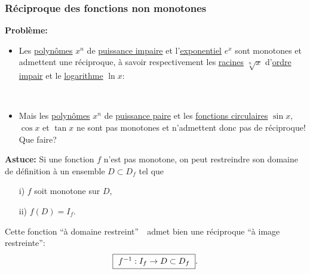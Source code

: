\documentclass[10pt]{beamer}
\newcommand{\bitem}{\item[$\bullet$]}
\begin{document}

\begin{frame}[plain]
\frametitle{\bf R\'eciproque des fonctions non monotones}
\medskip 

{\bf Probl\`eme:}
\begin{itemize}
\bitem
Les \underline{polyn\^omes} $x^n$ de \underline{puissance impaire} et 
l'\underline{exponentiel} $e^x$ sont monotones et admettent 
une r\'eciproque, \`a savoir respectivement les \underline{racines} $\sqrt[n]{x}$ 
d'\underline{ordre impair} et le \underline{logarithme} $\ln{x}$: 
\begin{center}
\\ 
\end{center}
 \vspace*{1mm}

\pause
\bitem
Mais les \underline{polyn\^omes} $x^n$ de \underline{puissance paire} et  
les \underline{fonctions circulaires} $\sin x$, $\cos x$ et $\tan x$ 
ne sont pas monotones et n'admettent donc pas de r\'eciproque! 
Que faire?
\end{itemize}
\vspace*{1mm}

\pause
{\bf Astuce:}\quad 
Si une fonction $f$ n'est pas monotone, on peut restreindre 
son domaine de d\'efinition \`a un ensemble $D\subset D_f$ tel que 
\vspace*{-1mm}

\qquad
\parbox{9cm}{
\begin{itemize}
\item[i)]
$f$ soit monotone sur $D$,
\item[ii)]
$f(D)=I_f$. 
\end{itemize}}
\vspace*{-1mm}

Cette fonction ``\`a domaine restreint''\ 
\  
admet bien une r\'eciproque ``\`a image restreinte'':
$$
\mbox{\framebox{\ $f^{-1}:I_f\rightarrow D\subset D_f$\ }}. 
$$

\end{frame}

\end{document}
